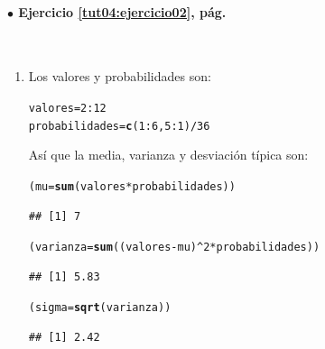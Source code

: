 \documentclass[10pt,a4paper]{article}\usepackage[]{graphicx}\usepackage[]{color}
\makeatletter
\newcommand{\hlnum}[1]{\textcolor[rgb]{0.686,0.059,0.569}{#1}}%
\newcommand{\hlopt}[1]{\textcolor[rgb]{0,0,0}{#1}}%
\newcommand{\hlstd}[1]{\textcolor[rgb]{0.345,0.345,0.345}{#1}}%
\newcommand{\hlkwb}[1]{\textcolor[rgb]{0.69,0.353,0.396}{#1}}%
\newcommand{\hlkwd}[1]{\textcolor[rgb]{0.737,0.353,0.396}{\textbf{#1}}}%
\newenvironment{kframe}{%
 \def\at@end@of@kframe{}%
 \ifinner\ifhmode%
  \def\at@end@of@kframe{\end{minipage}}%
  \begin{minipage}{\columnwidth}%
 \fi\fi%
 \def\FrameCommand##1{\hskip\@totalleftmargin \hskip-\fboxsep
 \colorbox{shadecolor}{##1}\hskip-\fboxsep
     \hskip-\linewidth \hskip-\@totalleftmargin \hskip\columnwidth}%
 \MakeFramed {\advance\hsize-\width
   \@totalleftmargin\z@ \linewidth\hsize
   \@setminipage}}%
 {\par\unskip\endMakeFramed%
 \at@end@of@kframe}
\newenvironment{knitrout}{}{} %
\makeatother
\begin{document}
\paragraph{\bf $\bullet$ Ejercicio \ref{tut04:ejercicio02}, pág. \pageref{tut04:ejercicio02}}
\label{tut04:ejercicio02:sol}\quad\\

\begin{enumerate}
  \item Los valores y probabilidades son:
\begin{knitrout}
\color{fgcolor}\begin{kframe}
\begin{alltt}
\hlstd{valores} \hlkwb{=} \hlnum{2}\hlopt{:}\hlnum{12}
\hlstd{probabilidades} \hlkwb{=} \hlkwd{c}\hlstd{(}\hlnum{1}\hlopt{:}\hlnum{6}\hlstd{,}\hlnum{5}\hlopt{:}\hlnum{1}\hlstd{)}\hlopt{/}\hlnum{36}
\end{alltt}
\end{kframe}
\end{knitrout}
    Así que la media, varianza y desviación típica son:
\begin{knitrout}
\color{fgcolor}\begin{kframe}
\begin{alltt}
\hlstd{(mu}\hlkwb{=}\hlkwd{sum}\hlstd{(valores}\hlopt{*}\hlstd{probabilidades) )}
\end{alltt}
\begin{verbatim}
## [1] 7
\end{verbatim}
\begin{alltt}
\hlstd{(varianza}\hlkwb{=}\hlkwd{sum}\hlstd{((valores}\hlopt{-}\hlstd{mu)}\hlopt{^}\hlnum{2}\hlopt{*}\hlstd{probabilidades) )}
\end{alltt}
\begin{verbatim}
## [1] 5.83
\end{verbatim}
\begin{alltt}
\hlstd{(sigma}\hlkwb{=}\hlkwd{sqrt}\hlstd{(varianza) )}
\end{alltt}
\begin{verbatim}
## [1] 2.42
\end{verbatim}
\end{kframe}
\end{knitrout}


\end{enumerate}
\end{document}
